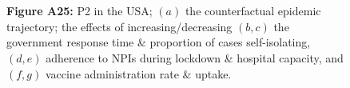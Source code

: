 \documentclass[paper=a4,fontsize=11pt]{article}
\begin{document}
\begin{figure}[!h]
  \\
  \hspace{1.76cm}
  \\
  \caption*{\textbf{Figure A25:} P2 in the USA; $(a)$ the counterfactual epidemic trajectory; the effects of increasing/decreasing $(b,c)$ the government response time \& proportion of cases self-isolating, $(d,e)$ adherence to NPIs during lockdown \& hospital capacity, and $(f,g)$ vaccine administration rate \& uptake.}
\end{figure}
\end{document}
